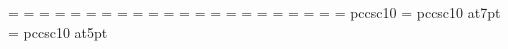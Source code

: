 \def\rm{\fam=0 \tenrm}%
%
=\teni
{}=\seveni
{}=\fivei
\def\mit{\fam=1}%
%
=\tensy
{}=\sevensy
{}=\fivesy
\def\cal{\fam=2}%
%
=\tenex
{}=\sevenex
{}=\fiveex
%
\def\it{\fam=\itfam \tenit}%
\textfont\itfam=\tenit
\scriptfont\itfam=\sevenit
\scriptscriptfont\itfam=\fiveit
%
\def\sl{\fam=\slfam \tensl}%
\textfont\slfam=\tensl
\scriptfont\slfam=\sevensl
\scriptscriptfont\slfam=\fivesl
%
\def\bf{\fam=\bffam \tenbf}%
\textfont\bffam=\tenbf
\scriptfont\bffam=\sevenbf
\scriptscriptfont\bffam=\fivebf
%
\def\tt{\fam=\ttfam \tentt}%
\textfont\ttfam=\tentt
\scriptfont\ttfam=\seventt
\scriptscriptfont\ttfam=\fivett
%
%
%
\def\twentycaps{\font\fzzozznzzt=   pccsc10 at20pt \fzzozznzzt}%
\def\eighteencaps{\font\fzzozznzzt= pccsc10 at18pt \fzzozznzzt}%
\def\sixteencaps{\font\fzzozznzzt=  pccsc10 at16pt \fzzozznzzt}%
\def\fourteencaps{\font\fzzozznzzt=    pccsc10 at14pt \fzzozznzzt}%
\def\twelvecaps{\font\fzzozznzzt=   pccsc10 at12pt \fzzozznzzt}%
\font\caps=            pccsc10%
\def\ninecaps{\font\fzzozznzzt=        pccsc10 at9pt \fzzozznzzt}%
\def\eightcaps{\font\fzzozznzzt=       pccsc10 at8pt \fzzozznzzt}%
\font\sevencaps=       pccsc10 at7pt
\def\sixcaps{\font\fzzozznzzt=         pccsc10 at6pt \fzzozznzzt}%
\font\fivecaps=        pccsc10 at5pt
%
%
\rm